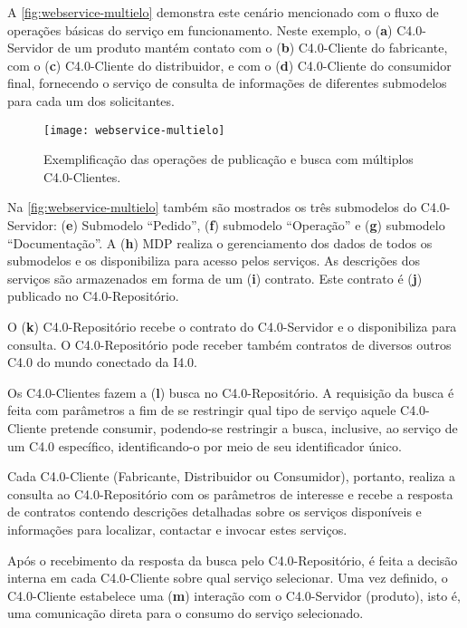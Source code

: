 A \autoref{fig:webservice-multielo} demonstra este cenário mencionado com o fluxo de operações básicas do serviço em funcionamento. Neste exemplo, o (\textbf{a}) C4.0-Servidor de um produto mantém contato com o (\textbf{b}) C4.0-Cliente do fabricante, com o (\textbf{c}) C4.0-Cliente do distribuidor, e com o (\textbf{d}) C4.0-Cliente do consumidor final, fornecendo o serviço de consulta de informações de diferentes submodelos para cada um dos solicitantes.

\begin{figure}[htb]
	\centering
	\texttt{[image: webservice-multielo]}
	\caption{Exemplificação das operações de publicação e busca com múltiplos C4.0-Clientes.}
	\label{fig:webservice-multielo}
\end{figure}

Na \autoref{fig:webservice-multielo} também são mostrados os três submodelos do C4.0-Servidor: (\textbf{e}) Submodelo ``Pedido'', (\textbf{f}) submodelo ``Operação'' e (\textbf{g}) submodelo ``Documentação''. A (\textbf{h}) MDP realiza o gerenciamento dos dados de todos os submodelos e os disponibiliza para acesso pelos serviços. As descrições dos serviços são armazenados em forma de um (\textbf{i}) contrato. Este contrato é (\textbf{j}) publicado no C4.0-Repositório.

O (\textbf{k}) C4.0-Repositório recebe o contrato do C4.0-Servidor e o disponibiliza para consulta. O C4.0-Repositório pode receber também contratos de diversos outros C4.0 do mundo conectado da I4.0.

Os C4.0-Clientes fazem a (\textbf{l}) busca no C4.0-Repositório. A requisição da busca é feita com parâmetros a fim de se restringir qual tipo de serviço aquele C4.0-Cliente pretende consumir, podendo-se restringir a busca, inclusive, ao serviço de um C4.0 específico, identificando-o por meio de seu identificador único.

Cada C4.0-Cliente (Fabricante, Distribuidor ou Consumidor), portanto, realiza a consulta ao C4.0-Repositório com os parâmetros de interesse e recebe a resposta de contratos contendo descrições detalhadas sobre os serviços disponíveis e informações para localizar, contactar e invocar estes serviços.

Após o recebimento da resposta da busca pelo C4.0-Repositório, é feita a decisão interna em cada C4.0-Cliente sobre qual serviço selecionar. Uma vez definido, o C4.0-Cliente estabelece uma (\textbf{m}) interação com o C4.0-Servidor (produto), isto é, uma comunicação direta para o consumo do serviço selecionado.

